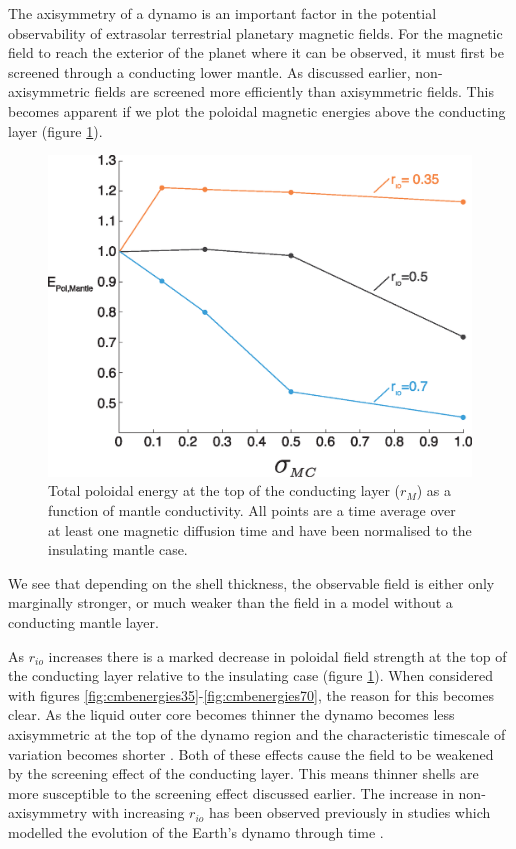The axisymmetry of a dynamo is an important factor in the potential observability of extrasolar terrestrial planetary magnetic fields. For the magnetic field to reach the exterior of the planet where it can be observed, it must first be screened through a conducting lower mantle. As  discussed earlier, non-axisymmetric fields are screened more efficiently than axisymmetric fields. This becomes apparent if we plot the poloidal magnetic energies above the conducting layer (figure \ref{fig:ddppoloidaltotal}).
\begin{figure}
\noindent\includegraphics[width=.7\linewidth]{Chapter3/Figures/f4.eps}
\centering
\caption{Total poloidal energy at the top of the conducting layer ($r_{M}$) as a function of mantle conductivity. All points are a time average over at least one magnetic diffusion time and have been normalised to the insulating mantle case.}
\label{fig:ddppoloidaltotal}
\end{figure}
We see that depending on the shell thickness, the observable field is either only marginally stronger, or much weaker than the field in a model without a conducting mantle layer.

As $r_{io}$ increases there is a marked decrease in poloidal field strength at the top of the conducting layer relative to the insulating case (figure \ref{fig:ddppoloidaltotal}). When considered with figures \ref{fig:cmbenergies35}-\ref{fig:cmbenergies70}, the reason for this becomes clear. As the liquid outer core becomes thinner the dynamo becomes less axisymmetric at the top of the dynamo region and the characteristic timescale of variation becomes shorter \citep{aubert2009}. Both of these effects cause the field to be weakened by the screening effect of the conducting layer. This means thinner shells are more susceptible to the screening effect discussed earlier. The increase in non-axisymmetry with increasing $r_{io}$ has been observed previously in studies which modelled the evolution of the Earth's dynamo through time \citep{aubert2009, roberts2001}.

